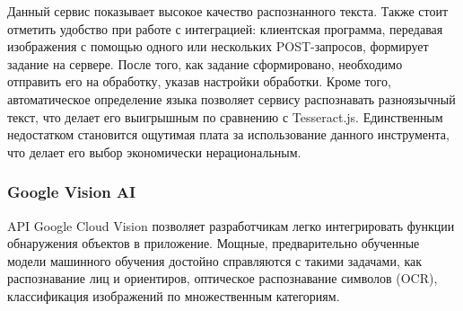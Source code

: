 \documentclass[14pt]{mmcs_article}
\begin{document}
 Данный сервис показывает высокое качество распознанного текста. Также стоит отметить удобство при работе с интеграцией: клиентская программа, передавая изображения с помощью одного или нескольких POST-запросов, формирует задание на сервере. После того, как задание сформировано, необходимо отправить его на обработку, указав настройки обработки. Кроме того, автоматическое определение языка позволяет сервису распознавать разноязычный текст, что делает его выигрышным по сравнению с Tesseract.js. Единственным недостатком становится ощутимая плата за использование данного инструмента, что делает его выбор экономически нерациональным.
 
\subsubsection{Google Vision AI}  
 
API Google Cloud Vision позволяет разработчикам легко интегрировать функции обнаружения объектов в приложение. Мощные, предварительно обученные модели машинного обучения достойно справляются с такими задачами, как распознавание лиц и ориентиров, оптическое распознавание символов (OCR), классификация изображений по множественным категориям.
\end{document}
